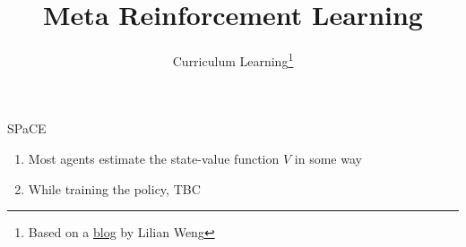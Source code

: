 


\title[Meta-RL]{Meta Reinforcement Learning}
\subtitle{Curriculum Learning\footnote{Based on a \href{https://lilianweng.github.io/lil-log/2020/01/29/curriculum-for-reinforcement-learning.html}{blog} by Lilian Weng}}



	
	\maketitle

\begin{frame}[c]{SPaCE~}
	
	\begin{enumerate}
		\item Most agents estimate the state-value function $V$ in some way
		\item While training the policy, TBC
	\end{enumerate}
	
\end{frame}

